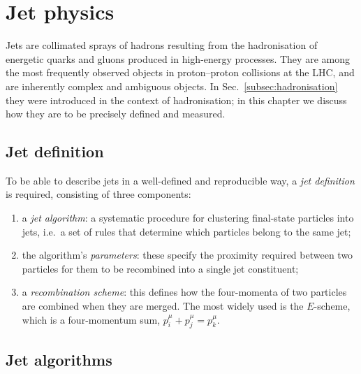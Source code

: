 \chapter{Jet physics}
\label{sec:jet-phys}

Jets are collimated sprays of hadrons resulting from the
hadronisation of energetic quarks and gluons produced in
high-energy processes. They are among the most frequently
observed objects in proton--proton collisions at the LHC, and
are inherently complex and ambiguous objects. In
Sec.~\ref{subsec:hadronisation} they were introduced in the
context of hadronisation; in this chapter we discuss how they
are to be precisely defined and measured.

\section{Jet definition}
\label{sec:jet-def}

To be able to describe jets in a well-defined and reproducible way, 
a \emph{jet definition} is required, consisting of three components:
\begin{enumerate}
    \item a \emph{jet algorithm}: a systematic procedure for clustering 
    final-state particles into jets, i.e.\ a set of rules that determine 
    which particles belong to the same jet;
    
    \item the algorithm's \emph{parameters}: these specify the proximity required between two particles for them to be recombined into a single jet constituent;
    
\item a \emph{recombination scheme}: this defines how the four-momenta of two particles are combined when they are merged. The most widely used is the $E$-scheme, which is a four-momentum sum, $p_i^\mu + p_j^\mu = p_k^\mu$.
\end{enumerate}


\section{Jet algorithms}
\label{subsec:jet-algorithm}

